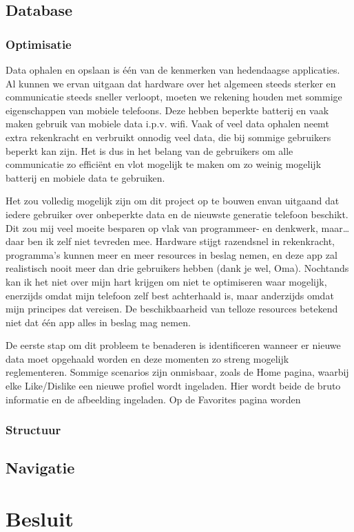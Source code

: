 \documentclass{report}
\begin{document}
\section{Database}
\subsection{Optimisatie}
Data ophalen en opslaan is één van de kenmerken van hedendaagse applicaties.
Al kunnen we ervan uitgaan dat hardware over het algemeen steeds sterker en communicatie steeds sneller verloopt, moeten we rekening houden met sommige eigenschappen van mobiele telefoons.
Deze hebben beperkte batterij en vaak maken gebruik van mobiele data i.p.v. wifi.
Vaak of veel data ophalen neemt extra rekenkracht en verbruikt onnodig veel data, die bij sommige gebruikers beperkt kan zijn.
Het is dus in het belang van de gebruikers om alle communicatie zo efficiënt en vlot mogelijk te maken om zo weinig mogelijk batterij en mobiele data te gebruiken.


Het zou volledig mogelijk zijn om dit project op te bouwen envan uitgaand dat iedere gebruiker over onbeperkte data en de nieuwste generatie telefoon beschikt.
Dit zou mij veel moeite besparen op vlak van programmeer- en denkwerk, maar\ldots daar ben ik zelf niet tevreden mee.
Hardware stijgt razendsnel in rekenkracht, programma's kunnen meer en meer resources in beslag nemen, en deze app zal realistisch nooit meer dan drie gebruikers hebben (dank je wel, Oma).
Nochtands kan ik het niet over mijn hart krijgen om niet te optimiseren waar mogelijk, enerzijds omdat mijn telefoon zelf best achterhaald is, maar anderzijds omdat mijn principes dat vereisen.
De beschikbaarheid van telloze resources betekend niet dat één app alles in beslag mag nemen.



De eerste stap om dit probleem te benaderen is identificeren wanneer er nieuwe data moet opgehaald worden en deze momenten zo streng mogelijk reglementeren.
Sommige scenarios zijn onmisbaar, zoals de Home pagina, waarbij elke Like/Dislike een nieuwe profiel wordt ingeladen. Hier wordt beide de bruto informatie en de afbeelding ingeladen.
Op de Favorites pagina worden
 


\subsection{Structuur}

\section{Navigatie}


\chapter{Besluit}
\end{document}
